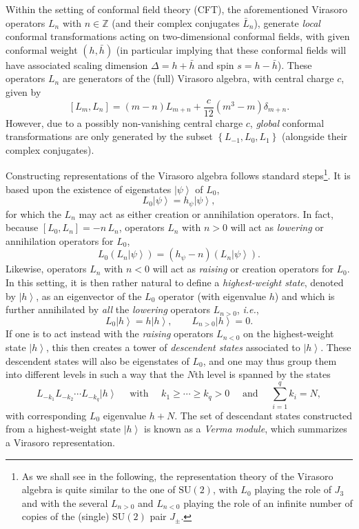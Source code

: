 \documentclass[11pt,a4paper]{article}
\def\BZ{{\mathbb Z}}
\newcommand{\be}{\begin{equation}}
\newcommand{\ee}{\end{equation}}
\begin{document}
Within the setting of conformal field theory (CFT), the aforementioned Virasoro operators $L_{n}$ with $n \in \BZ$ (and their complex conjugates $\bar{L}_{n}$), generate \textit{local} conformal transformations acting on two-dimensional conformal fields, with given conformal weight $(h,\bar{h})$ (in particular implying that these conformal fields will have associated scaling dimension $\Delta=h+\bar{h}$ and spin $s=h-\bar{h}$). These operators $L_{n}$ are generators of the (full) Virasoro algebra, with central charge $c$, given by
%
\be
\label{c-VIR}
\left[ L_{m}, L_{n} \right] = \left(m-n\right) L_{m+n} + \frac{c}{12} \left(m^{3}-m\right) \delta_{m+n}.
\ee
%
\noindent
However, due to a possibly non-vanishing central charge $c$, \textit{global} conformal transformations are only generated by the subset $\left\{ L_{-1}, L_{0}, L_{1} \right\}$ (alongside their complex conjugates). 

Constructing representations of the Virasoro algebra follows standard steps\footnote{As we shall see in the following, the representation theory of the Virasoro algebra is quite similar to the one of $\text{SU}(2)$, with $L_0$ playing the role of $J_3$ and with the several $L_{n>0}$ and $L_{n<0}$ playing the role of an infinite number of copies of the (single) $\text{SU}(2)$ pair $J_{\pm}$.}. It is based upon the existence of eigenstates $\left|\psi\right\rangle$ of $L_0$,
%
\be
L_0 \left|\psi\right\rangle = h_\psi \left|\psi\right\rangle,
\ee
%
\noindent
for which the $L_n$ may act as either creation or annihilation operators. In fact, because $\left[ L_0, L_{n} \right] = -n\, L_{n}$, operators $L_n$ with $n>0$ will act as \textit{lowering} or annihilation operators for $L_0$,
%
\be
L_0 \left( L_n \left|\psi\right\rangle \right) = \left( h_\psi-n \right) \left( L_n \left|\psi\right\rangle \right).
\ee
%
\noindent
Likewise, operators $L_n$ with $n<0$ will act as \textit{raising} or creation operators for $L_0$. In this setting, it is then rather natural to define a \textit{highest-weight state}, denoted by $\left|h\right\rangle$, as an eigenvector of the $L_0$ operator (with eigenvalue $h$) and which is further annihilated by \textit{all} the \textit{lowering} operators $L_{n>0}$, \textit{i.e.},
%
\be
L_0 \left|h\right\rangle = h \left|h\right\rangle, \qquad L_{n>0} \left|h\right\rangle = 0.
\ee
%
\noindent
If one is to act instead with the \textit{raising} operators $L_{n<0}$ on the highest-weight state $\left|h\right\rangle$, this then creates a tower of \textit{descendent states} associated to $\left|h\right\rangle$. These descendent states will also be eigenstates of $L_0$, and one may thus group them into different levels in such a way that the $N$th level is spanned by the states
%
\be
L_{-k_1} L_{-k_2} \cdots L_{-k_q} \left|h\right\rangle \quad \text{ with } \quad k_1 \ge \cdots \ge k_q > 0 \quad \text{ and } \quad \sum_{i=1}^q k_i = N,
\ee
%
\noindent
with corresponding $L_0$ eigenvalue $h+N$. The set of descendant states constructed from a highest-weight state $\left|h\right\rangle$ is known as a \textit{Verma module}, which summarizes a Virasoro representation.
\end{document}
